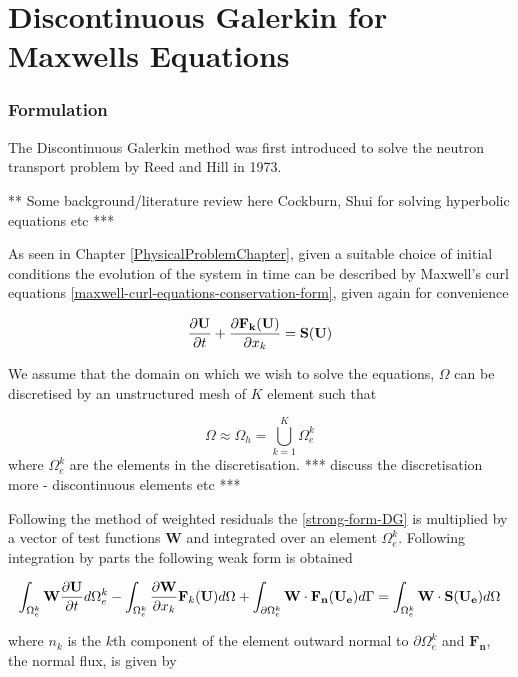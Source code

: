 \chapter{Discontinuous Galerkin for Maxwells Equations} %
\label{Chapter3}

\subsection{Formulation}

The Discontinuous Galerkin method was first introduced to solve the neutron transport problem by Reed and Hill \cite{} in 1973.

** Some background/literature review here Cockburn, Shui for solving hyperbolic equations etc ***

As seen in Chapter \ref{PhysicalProblemChapter}, given a suitable choice of initial conditions the evolution of the system in time can be described by Maxwell's curl equations \eqref{maxwell-curl-equations-conservation-form}, given again for convenience

$$
\frac{\partial \mathbf{U}}{\partial t} + \frac{\partial \mathbf{F_k (\mathbf{U})} }{\partial x_k}  = \mathbf{S(U)}
\label{strong-form-DG}
$$

We assume that the domain on which we wish to solve the equations, $\Omega$ can be discretised by an unstructured mesh of $K$ element such that

\begin{equation}
  \Omega \approx \Omega_h = \mathop{\bigcup}_{k=1}^{K} \Omega_e^k
\end{equation}
where $\Omega_e^k$ are the elements in the discretisation.  *** discuss the discretisation more - discontinuous elements etc ***

Following the method of weighted residuals the \eqref{strong-form-DG} is multiplied by a vector of test functions $\mathbf{W}$ and integrated over an element $\Omega_e^k$. Following integration by parts the following weak form is obtained

$$
\int_{\Omega_e^k} \mathbf{W} \frac{\partial \mathbf{U}}{\partial t} d\Omega_e^k  - \int_{\Omega_e^k} \frac{\partial \mathbf{W}}{ \partial x_k} \mathbf{F}_k(\mathbf{U}) d\Omega + \int_{\partial \Omega_e^k} \mathbf{W} \cdot \mathbf{F_n}(\mathbf{U_e}) d\Gamma = \int_{\Omega_e^k} \mathbf{W} \cdot \mathbf{S}(\mathbf{U_e}) d\Omega
\label{maxwell-DG-weak-form}
$$

where $n_k$ is the $k$th component of the element outward normal to $\partial \Omega_e^k$ and $\mathbf{F_n}$, the normal flux, is given by

